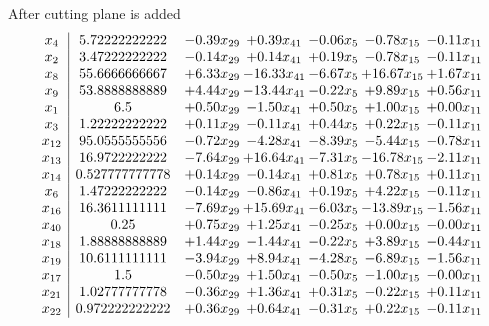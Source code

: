 \documentclass[8pt]{article}
\begin{document}
 After cutting plane is added 
\[\begin{array}{c| c c@{\hskip 2pt} c@{\hskip 2pt} c@{\hskip 2pt} c@{\hskip 2pt} c@{\hskip 2pt} }
 x_{4}   &  5.72222222222 & -0.39 x_{29} & +  0.39 x_{41} & -0.06 x_{5} & -0.78 x_{15} & -0.11 x_{11}\\
 x_{2}   &  3.47222222222 & -0.14 x_{29} & +  0.14 x_{41} & +  0.19 x_{5} & -0.78 x_{15} & -0.11 x_{11}\\
 x_{8}   &  55.6666666667 & +  6.33 x_{29} & -16.33 x_{41} & -6.67 x_{5} & + 16.67 x_{15} & +  1.67 x_{11}\\
 x_{9}   &  53.8888888889 & +  4.44 x_{29} & -13.44 x_{41} & -0.22 x_{5} & +  9.89 x_{15} & +  0.56 x_{11}\\
 x_{1}   &  6.5 & +  0.50 x_{29} & -1.50 x_{41} & +  0.50 x_{5} & +  1.00 x_{15} & +  0.00 x_{11}\\
 x_{3}   &  1.22222222222 & +  0.11 x_{29} & -0.11 x_{41} & +  0.44 x_{5} & +  0.22 x_{15} & -0.11 x_{11}\\
 x_{12}   &  95.0555555556 & -0.72 x_{29} & -4.28 x_{41} & -8.39 x_{5} & -5.44 x_{15} & -0.78 x_{11}\\
 x_{13}   &  16.9722222222 & -7.64 x_{29} & + 16.64 x_{41} & -7.31 x_{5} & -16.78 x_{15} & -2.11 x_{11}\\
 x_{14}   &  0.527777777778 & +  0.14 x_{29} & -0.14 x_{41} & +  0.81 x_{5} & +  0.78 x_{15} & +  0.11 x_{11}\\
 x_{6}   &  1.47222222222 & -0.14 x_{29} & -0.86 x_{41} & +  0.19 x_{5} & +  4.22 x_{15} & -0.11 x_{11}\\
 x_{16}   &  16.3611111111 & -7.69 x_{29} & + 15.69 x_{41} & -6.03 x_{5} & -13.89 x_{15} & -1.56 x_{11}\\
 x_{40}   &  0.25 & +  0.75 x_{29} & +  1.25 x_{41} & -0.25 x_{5} & +  0.00 x_{15} & -0.00 x_{11}\\
 x_{18}   &  1.88888888889 & +  1.44 x_{29} & -1.44 x_{41} & -0.22 x_{5} & +  3.89 x_{15} & -0.44 x_{11}\\
 x_{19}   &  10.6111111111 & -3.94 x_{29} & +  8.94 x_{41} & -4.28 x_{5} & -6.89 x_{15} & -1.56 x_{11}\\
 x_{17}   &  1.5 & -0.50 x_{29} & +  1.50 x_{41} & -0.50 x_{5} & -1.00 x_{15} & -0.00 x_{11}\\
 x_{21}   &  1.02777777778 & -0.36 x_{29} & +  1.36 x_{41} & +  0.31 x_{5} & -0.22 x_{15} & +  0.11 x_{11}\\
 x_{22}   &  0.972222222222 & +  0.36 x_{29} & +  0.64 x_{41} & -0.31 x_{5} & +  0.22 x_{15} & -0.11 x_{11}\\

\end{array}\]
\end{document}
